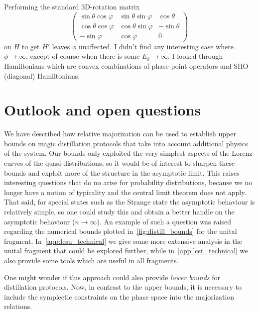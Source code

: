 \documentclass[pra,
aps,
twocolumn,
superscriptaddress,
groupedaddress,
nofootinbib,
reprint
]{revtex4-1}
\begin{document}
Performing the standard 3D-rotation matrix 
\begin{equation}
\begin{pmatrix}
\sin{\theta}\cos{\varphi} & \sin{\theta}\sin{\varphi} & \cos{\theta}\\
\cos{\theta}\cos{\varphi} & \cos{\theta}\sin{\varphi} & -\sin{\theta}\\
-\sin{\varphi} & \cos{\varphi} & 0
\end{pmatrix}
\end{equation}
on $H$ to get $H'$ leaves $\phi$ unaffected.
I didn't find any interesting case where $\phi \rightarrow \infty$, except of course when there is some $E_k \rightarrow \infty$. 
I looked through Hamiltonians which are convex combinations of phase-point operators and SHO (diagonal) Hamiltonians.

\section{Outlook and open questions}
\label{sec:lower_bounds}

We have described how relative majorization can be used to establish upper bounds on magic distillation protocols that take into account additional physics of the system. Our bounds only exploited the very simplest aspects of the Lorenz curves of the quasi-distributions, so it would be of interest to sharpen these bounds and exploit more of the structure in the asymptotic limit. This raises interesting questions that do no arise for probability distributions, because we no longer have a notion of typicality and the central limit theorem does not apply. That said, for special states such as the Strange state the asymptotic behaviour is relatively simple, so one could study this and obtain a better handle on the asymptotic behaviour ($n \rightarrow \infty$). An example of such a question was raised regarding the numerical bounds plotted in~\cref{fig:distill_bounds} for the unital fragment. In~\cref{app:lcsu_technical} we give some more extensive analysis in the unital fragment that could be explored further, while in~\cref{app:lcst_technical} we also provide some tools which are useful in all fragments.

One might wonder if this approach could also provide \emph{lower bounds} for distillation protocols. Now, in contrast to the upper bounds, it is necessary to include the symplectic constraints on the phase space into the majorization relations.
\end{document}
